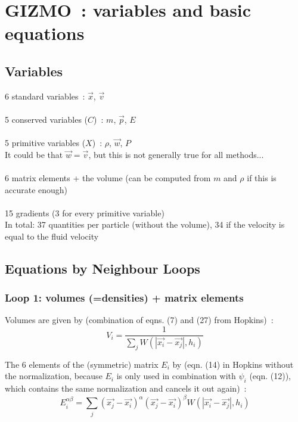 
\section{GIZMO~: variables and basic equations}


\subsection{Variables}
6 standard variables~: $\vec{x}$, $\vec{v}$\\  \\
5 conserved variables ($C$)~: $m$, $\vec{p}$, $E$\\ \\
5 primitive variables ($X$)~: $\rho$, $\vec{w}$, $P$\\
It could be that $\vec{w} = \vec{v}$, but this is not generally true for all methods...\\ \\
6 matrix elements + the volume (can be computed from $m$ and $\rho$ if this is
accurate enough)\\ \\
15 gradients (3 for every primitive variable)\\

In total: 37 quantities per particle (without the volume), 34 if the velocity is equal to the fluid velocity

\subsection{Equations by Neighbour Loops}

\subsubsection{Loop 1: volumes (=densities) + matrix elements}
Volumes are given by (combination of eqns. (7) and (27) from Hopkins)~:
\begin{equation}
V_i = \frac{1}{\sum_j W(|\vec{x_i}-\vec{x_j}|, h_i)}
\end{equation}

The 6 elements of the (symmetric) matrix $E_i$ by (eqn. (14) in Hopkins without the normalization, because $E_i$ is only used in combination with $\psi_i$ (eqn. (12)), which contains the same normalization and cancels it out again)~:
\begin{equation}
E_i^{\alpha \beta} = \sum_j (\vec{x_j}-\vec{x_i})^\alpha (\vec{x_j}-\vec{x_i})^\beta W(|\vec{x_i}-\vec{x_j}|, h_i)
\end{equation}

